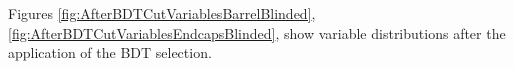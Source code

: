 %


Figures \ref{fig:AfterBDTCutVariablesBarrelBlinded}, \ref{fig:AfterBDTCutVariablesEndcapsBlinded},
show variable distributions after the application of the BDT selection.

